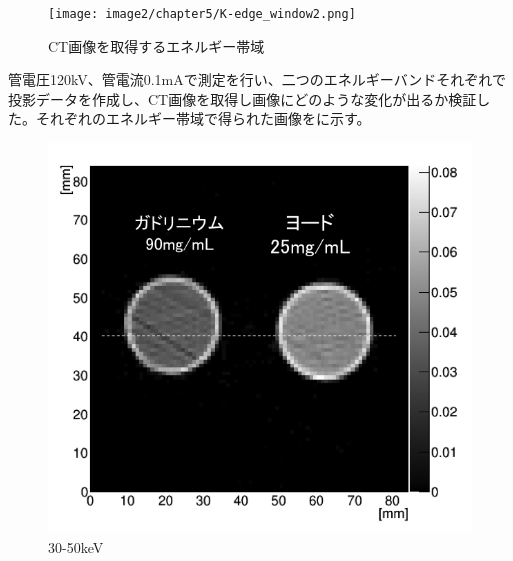 \begin{figure}[H]
 \begin{center}
 \texttt{[image: image2/chapter5/K-edge\_window2.png]} 
 \end{center}
 \caption{CT画像を取得するエネルギー帯域}
 \label{fig:K-edge_window}
\end{figure}


管電圧120kV、管電流0.1mAで測定を行い、二つのエネルギーバンドそれぞれで投影データを作成し、CT画像を取得し画像にどのような変化が出るか検証した。それぞれのエネルギー帯域で得られた画像をに示す。

\begin{figure}[H]
 \begin{minipage}{0.5\hsize}
  \begin{center}
 \includegraphics[bb=0.000000 0.000000 294.695638 271.177583,width=1\hsize]{image2/chapter5/hanten_30-50.png} 
  \end{center}
  \vspace{-1cm}
  \caption*{30-50keV}
 \end{minipage}
 \begin{minipage}{0.5\hsize}
  \begin{center}

\end{center}
\end{minipage}
\end{figure}
